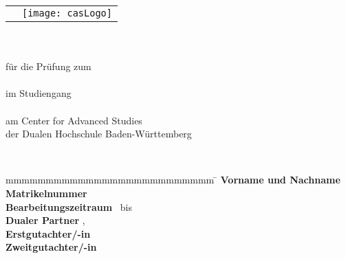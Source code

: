 \begin{titlepage}
	\begin{longtable}{p{8.2cm} p{5.4cm}}
		 &
		\texttt{[image: casLogo]}
	\end{longtable}
	\addtocounter{table}{-1}
	\enlargethispage{20mm}
	\begin{center}
		\vspace*{12mm}	{\LARGE\textbf \myTitel }\\
		\vspace*{12mm}	{\large\textbf \myArbeit}\\
		\vspace*{3mm} für die Prüfung zum \\
		{\textbf \myDegree}\\
		\vspace*{3mm} im Studiengang \\
		{\textbf \myStudiengang}\\

		\vspace*{3mm}		am Center for Advanced Studies\\
		der Dualen Hochschule Baden-Württemberg

		\vspace*{12mm}	\myDatum\\
	\end{center}
	\vspace*{32mm}
	\begin{spacing}{1.2}
		\begin{tabbing}
			mmmmmmmmmmmmmmmmmmmmmmmmmm     \= \kill
			\textbf{Vorname und Nachname}  \>  \myAutor\\
			\textbf{Matrikelnummer}  \>  \myMatrikelnr\\
			\textbf{Bearbeitungszeitraum}  \>  \myStart ~bis \myDatum\\
			\textbf{Dualer Partner}        \>  \myFirma, \myFirmenort\\
			\textbf{Erstgutachter/-in} 	   \>  \myBetreuer\\
			\textbf{Zweitgutachter/-in}    \>  \myGutachter
		\end{tabbing}
	\end{spacing}
\end{titlepage}